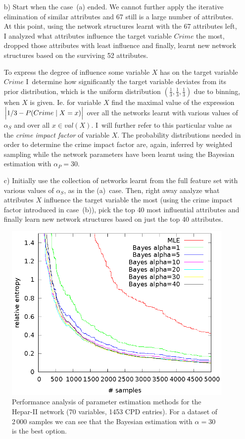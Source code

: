 \documentclass[english,cover]{fitthesis} %
\newcommand{\term}[1]{\emph{#1}}           %
\begin{document}
\begin{enumerate}
    \item[b)] Start when the case~(a) ended. We cannot further apply the iterative elimination of similar attributes and 67 still is a large number of attributes. At this point, using the network structures learnt with the 67 attributes left, I analyzed what attributes influence the target variable $Crime$ the most, dropped those attributes with least influence and finally, learnt new network structures based on the surviving 52 attributes.
    
    To express the degree of influence some variable $X$ has on the target variable $Crime$ I~determine how significantly the target variable deviates from its prior distribution, which is the uniform distribution $(\frac{1}{3}, \frac{1}{3}, \frac{1}{3})$ due to binning, when $X$ is given. Ie. for variable $X$ find the maximal value of the expression $\Bigl\lvert 1/3 - P(Crime \mid X = x) \Bigr\rvert$ over all the networks learnt with various values of $\alpha_S$ and over all $x \in val(X)$. I~will further refer to this particular value as the \term{crime impact factor} of variable $X$. The probability distributions needed in order to determine the crime impact factor are, again, inferred by weighted sampling while the network parameters have been learnt using the Bayesian estimation with $\alpha_P = 30$.
    
    \item[c)] Initially use the collection of networks learnt from the full feature set with various values of $\alpha_S$, as in the (a)~case. Then, right away analyze what attributes $X$ influence the target variable the most (using the crime impact factor introduced in case~(b)), pick the top 40 most influential attributes and finally learn new network structures based on just the top 40 attributes.
\end{enumerate}

\begin{figure}[htb]
    \centering
    \includegraphics[scale=1.2]{fig/kl-hepar2}
    \caption{Performance analysis of parameter estimation methods for the Hepar-II network (70 variables, 1453 CPD entries). For a dataset of 2\,000 samples we can see that the Bayesian estimation with $\alpha=30$ is the best option.}
    \label{fig:kl_div_hepar2}
\end{figure}
\end{document}
